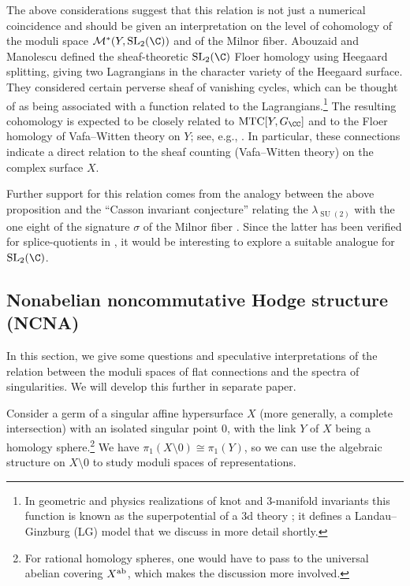 \documentclass[10pt,a4paper]{amsart}
\begin{document}
The above considerations suggest that this relation is not just a numerical coincidence and should be given an interpretation on the level of cohomology of the moduli space $\mathcal{M}^*(Y, \operatorname{SL}_2(\C))$ and of the Milnor fiber. Abouzaid and Manolescu defined the sheaf-theoretic $\operatorname{SL}_2(\C)$ Floer homology using Heegaard splitting, giving two Lagrangians in the character variety of the Heegaard surface. They considered certain perverse sheaf of vanishing cycles, which can be thought of as being associated with a function related to the Lagrangians.\footnote{In geometric and physics realizations of knot and 3-manifold invariants this function is known as the superpotential of a 3d theory \cite{ EGGKPSS22, EGGKPS22, FGSS12, GGP13a, GNSSS15,OV99, ERT22}; it defines a Landau--Ginzburg (LG) model that we discuss in more detail shortly.} The resulting cohomology is expected to be closely related to $\text{MTC} [Y, G_{\CC}]$ and to the Floer homology of Vafa--Witten theory on $Y$; see, e.g., \cite{GGP13b, GPV16, GSY22}. In particular, these connections indicate a direct relation to the sheaf counting (Vafa--Witten theory) on the complex surface $X$.

Further support for this relation comes from the analogy between the above proposition and the ``Casson invariant conjecture'' relating the $\lambda_{\operatorname{SU}(2)}$ with the one eight of the signature $\sigma$ of the Milnor fiber \cite{NeuWa90}. Since the latter has been verified for splice-quotients in \cite{NeOk08}, it would be interesting to explore a suitable analogue for $\operatorname{SL}_2(\C)$.

\subsection{Nonabelian noncommutative Hodge structure (NCNA)}

In this section, we give some questions and speculative interpretations of the relation between the moduli spaces of flat connections and the spectra of singularities. We will develop this further in separate paper.

Consider a germ of a singular affine hypersurface $X$ (more generally, a complete intersection) with an isolated singular point $0$, with the link $Y$ of $X$ being a homology sphere.\footnote{For rational homology spheres, one would have to pass to the universal abelian covering $X^{\rm ab}$, which makes the discussion more involved.} We have
$\pi_1(X {\setminus} 0) \cong \pi_1(Y)$,
so we can use the algebraic structure on $X {\setminus} 0$ to study moduli spaces of representations.
\end{document}
